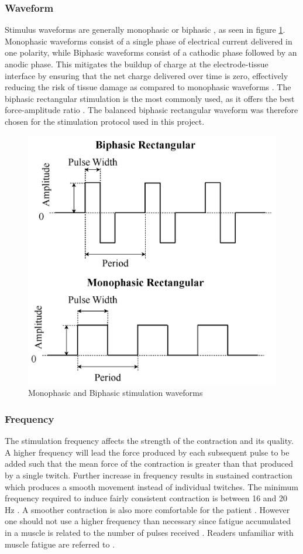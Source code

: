 \subsubsection{Waveform}
Stimulus waveforms are generally monophasic or biphasic \cite{lynch_functional_2008}, as seen in figure \ref{fig:twowave}. Monophasic waveforms consist of a single phase of electrical current delivered in one polarity, while Biphasic waveforms consist of a cathodic phase followed by an anodic phase. This mitigates the buildup of charge at the electrode-tissue interface by ensuring that the net charge delivered over time is zero, effectively reducing the risk of tissue damage as compared to monophasic waveforms \cite{peckham_functional_2005}. The biphasic rectangular stimulation is the most commonly used, as it offers the best force-amplitude ratio \cite{lynch_functional_2008}. The balanced biphasic rectangular waveform was therefore chosen for the stimulation protocol used in this project.
 \begin{figure} [H]
     \centering
     \includegraphics[width=0.6\linewidth]{images/twowaveform.jpg}
     \caption{Monophasic and Biphasic stimulation waveforms \cite{vrontos_electrical_2024}}
     \label{fig:twowave}
 \end{figure}

 \subsubsection{Frequency}
 The stimulation frequency affects the strength of the contraction and its quality. A higher frequency will lead the force produced by each subsequent pulse to be added such that the mean force of the contraction is greater than that produced by a single twitch. Further increase in frequency results in sustained contraction which produces a smooth movement instead of individual twitches. The minimum frequency required to induce fairly consistent contraction is between 16 and 20 Hz \cite{marquez-chin_functional_2020}. A smoother contraction is also more comfortable for the patient \cite{wood_chapter_2020}. However one should not use a higher frequency than necessary since fatigue accumulated in a muscle is related to the number of pulses received \cite{bigland-ritchie_muscle_2000}. Readers unfamiliar with muscle fatigue are referred to \cite{thrasher_reducing_2005}.

